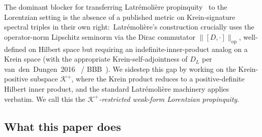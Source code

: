\documentclass[11pt,a4paper]{article}
\theoremstyle{plain}
\theoremstyle{definition}
\newcommand{\Krein}{\mathcal{K}}
\newcommand{\opnorm}[1]{\lVert #1 \rVert_{\mathrm{op}}}
\newcommand{\DL}{D_{L}}
\newcommand{\Kplus}{\Krein^{+}}
\begin{document}
The dominant blocker for transferring Latr\'emoli\`ere
propinquity~\cite{latremoliere_metric_st_2017,latremoliere2018} to the
Lorentzian setting is the absence of a published metric on
Krein-signature spectral triples in their own right:\ Latr\'emoli\`ere's
construction crucially uses the operator-norm Lipschitz seminorm via
the Dirac commutator $\opnorm{[D, \cdot]}$, well-defined on Hilbert
space but requiring an indefinite-inner-product analog on a Krein
space (with the appropriate Krein-self-adjointness of $\DL$ per
van~den~Dungen~2016~\cite{vandungen2016} /
BBB~\cite{bizi_brouder_besnard2018}). We sidestep this gap by working
on the Krein-positive subspace $\Kplus$, where the Krein product
reduces to a positive-definite Hilbert inner product, and the standard
Latr\'emoli\`ere machinery applies verbatim. We call this the
\emph{$\Kplus$-restricted weak-form Lorentzian propinquity}.

\subsection{What this paper does}\label{sec:what_this_paper_does}
\end{document}
